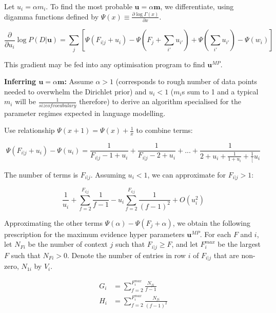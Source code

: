 Let $u_{i}=\alpha m_{i}$. To find the most probable $\boldsymbol{u}=\alpha\boldsymbol{m}$, we differentiate, using digamma functions defined by $\Psi(x)\equiv \frac{\partial \log \Gamma(x)}{\partial x}$. 

\begin{equation}
\frac{\partial}{\partial u_{i}}\log P(D|\boldsymbol{u})=\sum_{j}[\Psi(F_{i|j}+u_{i})-\Psi(F_{j}+\sum_{i'}u_{i'})+\Psi(\sum_{i'}u_{i'})-\Psi(w_{i})]
\end{equation}

\noindent This gradient may be fed into any optimisation program to find $\boldsymbol{u}^{MP}$.

\textbf{Inferring $\boldsymbol{u}=\alpha\boldsymbol{m}$: } Assume $\alpha>1$ (corresponds to rough number of data points needed to overwhelm the Dirichlet prior) and $u_{i}<1$ ($m_{i}$s sum to 1 and a typical $m_{i}$ will be $\frac{1}{size of vocabulary}$ therefore) to derive an algorithm specialised for the parameter regimes expected in language modelling.

Use relationship $\Psi(x+1)=\Psi(x)+\frac{1}{x}$ to combine terms:

\begin{equation}
\Psi(F_{i|j}+u_{i})-\Psi(u_{i})=\frac{1}{F_{i|j}-1+u_{i}}+\frac{1}{F_{i|j}-2+u_{i}}+...+\frac{1}{2+u_{i}+\frac{1}{1+u_{i}}+\frac{1}[u_{i}}
\end{equation}

\noindent The number of terms is $F_{i|j}$. Assuming $u_{i}<1$, we can approximate for $F_{i|j}>1$:

\begin{equation}
\frac{1}{u_{i}}+\sum_{f=2}^{F_{i|j}}\frac{1}{f-1}-u_{i}\sum_{f=2}^{F_{i|j}}\frac{1}{(f-1)^{2}}+O(u_{i}^{2})
\end{equation}

Approximating the other terms $\Psi(\alpha)-\Psi(F_{j}+\alpha)$, we obtain the following prescription for the maximum evidence hyper parameters $\boldsymbol{u}^{MP}$. For each $F$ and $i$, let $N_{Fi}$ be the number of context $j$ such that $F_{i|j}\geq F$, and let $F_{i}^{max}$ be the largest $F$ such that $N_{Fi}>0$. Denote the number of entries in row $i$ of $F_{i|j}$ that are non-zero, $N_{1i}$ by $V_{i}$.

\begin{align}
G_{i} &= \sum_{f=2}^{F_{i}^{max}}\frac{N_{fi}}{f-1}
\\
H_{i} &= \sum_{f=2}^{F_{i}^{max}}\frac{N_{fi}}{(f-1)^{2}}
\end{align}

